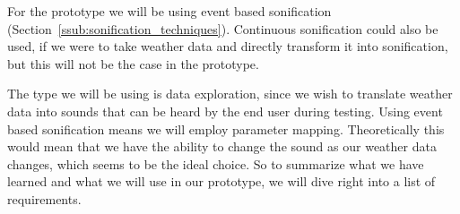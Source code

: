 For the prototype we will be using event based sonification (Section~\ref{ssub:sonification_techniques}). Continuous sonification could also be used, if we were to take weather data and directly transform it into sonification, but this will not be the case in the prototype. 

 The type we will be using is data exploration, since we wish to translate weather data into sounds that can be heard by the end user during testing.
Using event based sonification means we will employ parameter mapping. Theoretically this would mean that we have the ability to change the sound as our weather data changes, which seems to be the ideal choice.
So to summarize what we have learned and what we will use in our prototype, we will dive right into a list of requirements.




